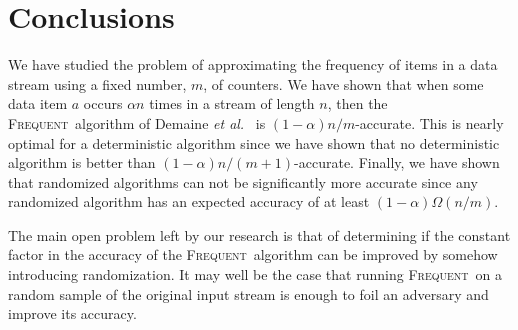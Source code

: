 \documentclass[charterfonts,lotsofwhite]{patmorin}
\newcommand{\frequent}{\textsc{Frequent}}
\newcommand{\seclabel}[1]{\label{sec:#1}}
\newcommand{\etal}{\emph{et al.}}
\begin{document}
\section{Conclusions}\seclabel{conclusions}

We have studied the problem of approximating the frequency of items in
a data stream using a fixed number, $m$, of counters.  We have shown
that when some data item $a$ occurs $\alpha n$ times in a stream of
length $n$, then the \frequent\ algorithm of Demaine \etal\
\cite{dlom02} is $(1-\alpha)n/m$-accurate.  This is nearly optimal
for a deterministic algorithm since we have shown that no
deterministic algorithm is better than $(1-\alpha)n/(m+1)$-accurate.
Finally, we have shown that randomized algorithms can not be
significantly more accurate since any randomized algorithm has an
expected accuracy of at least $(1-\alpha)\Omega(n/m)$.

The main open problem left by our research is that of determining if
the constant factor in the accuracy of the \frequent\ algorithm can
be improved by somehow introducing randomization.  It may well be the
case that running \frequent\ on a random sample of the original input
stream is enough to foil an adversary and improve its accuracy.



\end{document}
